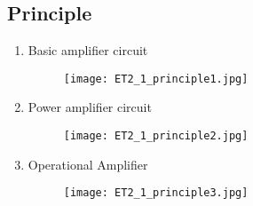 \subsection{Principle}
\begin{enumerate}
	\item Basic amplifier circuit
	
	\begin{figure}[htbp]
		\centering
		\texttt{[image: ET2\_1\_principle1.jpg]}
	\end{figure}
	
	\clearpage
	\item Power amplifier circuit
	
	\begin{figure}[htbp]
		\centering
		\texttt{[image: ET2\_1\_principle2.jpg]}
	\end{figure}
	
	\item Operational Amplifier
	
	\begin{figure}[htbp]
		\centering
		\texttt{[image: ET2\_1\_principle3.jpg]}
	\end{figure}
\end{enumerate}